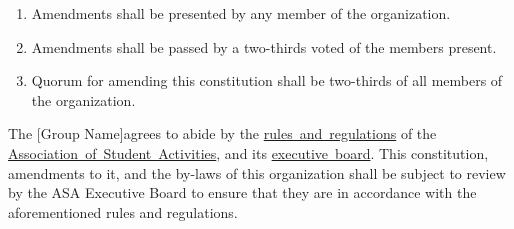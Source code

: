\documentclass{constitution}
\def\groupname{[Group Name]}
\begin{document}
\begin{enumerate}
    \item Amendments shall be presented by any member of the organization.

    \item Amendments shall be passed by a two-thirds voted of the members present.

    \item Quorum for amending this constitution shall be two-thirds of all members of the organization.
\end{enumerate}

The \groupname agrees to abide by the \href{https://asa.mit.edu/asa-policies}{rules~and~regulations} of the \href{https://asa.mit.edu/}{Association~of~Student~Activities}, and its \href{https://asa.mit.edu/about-asa/board-members}{executive~board}.
This constitution, amendments to it, and the by-laws of this organization shall be subject to review by the ASA Executive Board to ensure that they are in accordance with the aforementioned rules and regulations.
\end{document}
